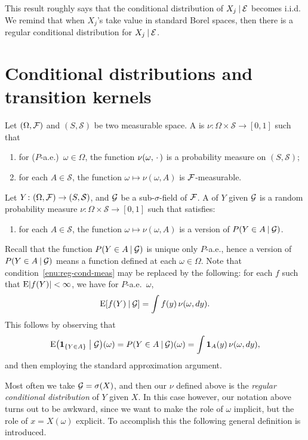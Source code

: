 This result roughly says that the conditional distribution of $X_j \mathbin{|} \mathcal E$ becomes i.i.d. We remind that when $X_j$'s take value in standard Borel spaces, then there is a regular conditional distribution for $X_j \mathbin{|} \mathcal E$.

\section{Conditional distributions and transition kernels}

\begin{defn} \label{def:reg-cond-dist}
Let $(\Omega,\mathcal{F})$ and $(S,\mathcal S)$ be two measurable space. A  is $\nu\colon \Omega\times \mathcal S \to [0,1]$ such that \begin{enumerate}
    \item for ($P$-a.e.)\ $\omega \in \Omega$, the function $\nu(\omega,\,\cdot\,)$ is a probability measure on $(S,\mathcal S)$;
    \item for each $A \in \mathcal S$, the function $\omega \mapsto \nu(\omega,A)$ is $\mathcal{F}$-measurable.
\end{enumerate}

Let $Y\colon (\Omega,\mathcal{F})\to (S,\mathcal S)$, and $\mathcal{G}$ be a sub-$\sigma$-field of $\mathcal{F}$. A  of $Y$ given $\mathcal{G}$ is a random probability measure $\nu\colon \Omega\times \mathcal S \to [0,1]$ such that satisfies: 
    \begin{enumerate}[resume]
        \item\label{enu:reg-cond-meas} for each $A \in \mathcal S$, the function $\omega \mapsto \nu(\omega,A)$ is a version of $P(Y\in A\mathbin{|} \mathcal{G})$.
    \end{enumerate}
\end{defn}

Recall that the function $P(Y \in A \mathbin{|} \mathcal{G})$ is unique only $P$-a.e., hence a version of $P(Y \in A \mathbin{|} \mathcal{G})$ means a function defined at each $\omega \in \Omega$. Note that condition~\ref{enu:reg-cond-meas} may be replaced by the following: for each $f$ such that $\mathop{}\!\mathrm{E} \lvert f(Y) \rvert < \infty$, we have for $P$-a.e.\ $\omega$, \[
    \mathop{}\!\mathrm{E} [f(Y ) \mathbin{|} \mathcal{G}] = \int f(y)\,\nu(\omega,dy).
\] This follows by observing that \[\mathop{}\!\mathrm{E}\bigl(\mathbf{1}_{\{Y \in A\}} \bigm\vert \mathcal{G}\bigr) (\omega) = P(Y \in A \mathbin{|} \mathcal{G}) (\omega) =\int \mathbf{1}_A(y)\,\nu(\omega,dy),\] and then employing the standard approximation argument.

Most often we take $\mathcal{G} = \sigma(X)$, and then our $\nu$ defined above is the \emph{regular conditional distribution} of $Y$ given $X$. In this case however, our notation above turns out to be awkward, since we want to make the role of $\omega$ implicit, but the role of $x = X(\omega)$ explicit. To accomplish this the following general definition is introduced.

